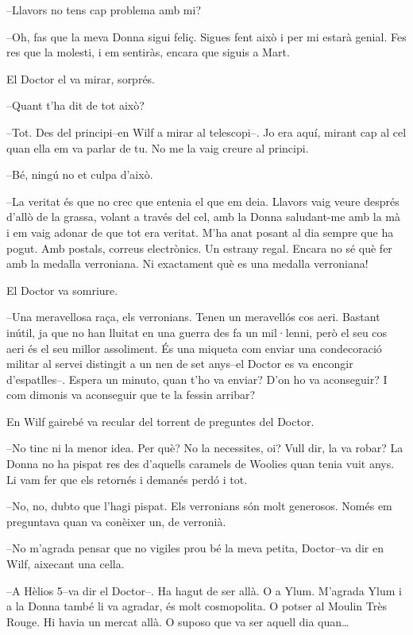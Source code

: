 --Llavors no tens cap problema amb mi?

--Oh, fas que la meva Donna sigui feliç. Sigues fent això i per mi
estarà genial. Fes res que la molesti, i em sentiràs, encara que siguis
a Mart.

El Doctor el va mirar, sorprés.

--Quant t'ha dit de tot això?

--Tot. Des del principi--en Wilf a mirar al telescopi--. Jo era aquí,
mirant cap al cel quan ella em va parlar de tu. No me la vaig creure al
principi.

--Bé, ningú no et culpa d'això.

--La veritat és que no crec que entenia el que em deia. Llavors vaig
veure després d'allò de la grassa, volant a través del cel, amb la Donna
saludant-me amb la mà i em vaig adonar de que tot era veritat. M'ha anat
posant al dia sempre que ha pogut. Amb postals, correus electrònics. Un
estrany regal. Encara no sé què fer amb la medalla verroniana. Ni
exactament què es una medalla verroniana!

El Doctor va somriure.

--Una meravellosa raça, els verronians. Tenen un meravellós cos aeri.
Bastant inútil, ja que no han lluitat en una guerra des fa un mil·lenni,
però el seu cos aeri és el seu millor assoliment. És una miqueta com
enviar una condecoració militar al servei distingit a un nen de set
anys--el Doctor es va encongir d'espatlles--. Espera un minuto, quan
t'ho va enviar? D'on ho va aconseguir? I com dimonis va aconseguir que
te la fessin arribar?

En Wilf gairebé va recular del torrent de preguntes del Doctor.

--No tinc ni la menor idea. Per què? No la necessites, oi? Vull dir, la
va robar? La Donna no ha pispat res des d'aquells caramels de Woolies
quan tenia vuit anys. Li vam fer que els retornés i demanés perdó i tot.

--No, no, dubto que l'hagi pispat. Els verronians són molt generosos.
Només em preguntava quan va conèixer un, de verronià.

--No m'agrada pensar que no vigiles prou bé la meva petita, Doctor--va
dir en Wilf, aixecant una cella.

--A Hèlios 5--va dir el Doctor--. Ha hagut de ser allà. O a Ylum.
M'agrada Ylum i a la Donna també li va agradar, és molt cosmopolita. O
potser al Moulin Très Rouge. Hi havia un mercat allà. O suposo que va
ser aquell dia quan\ldots{}

